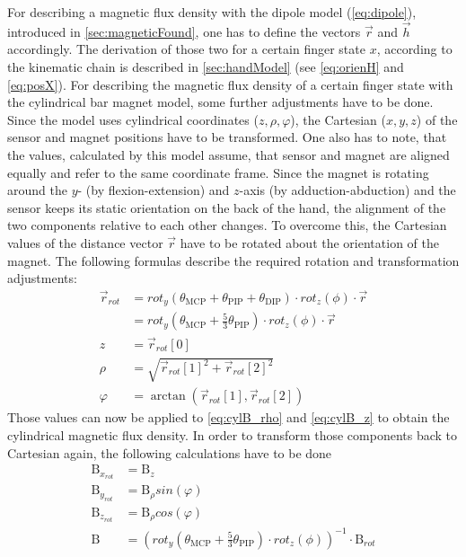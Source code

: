 For describing a magnetic flux density with the dipole model (\ref{eq:dipole}), introduced in \ref{sec:magneticFound}, one has to define the vectors $ \vec{r} $ and $ \vec{h} $ accordingly. The derivation of those two for a certain finger state $ x $, according to the kinematic chain is described in \ref{sec:handModel} (see \ref{eq:orienH} and \ref{eq:posX}). For describing the magnetic flux density of a certain finger state with the cylindrical bar magnet model, some further adjustments have to be done. Since the model uses cylindrical coordinates ($ z, \rho, \varphi $), the Cartesian ($ x, y, z $) of the sensor and magnet positions have to be transformed. One also has to note, that the values, calculated by this model assume, that sensor and magnet are aligned equally and refer to the same coordinate frame. Since the magnet is rotating around the $ y $- (by flexion-extension) and $ z $-axis (by adduction-abduction) and the sensor keeps its static orientation on the back of the hand, the alignment of the two components relative to each other changes. To overcome this, the Cartesian values of the distance vector $ \vec{r} $ have to be rotated about the orientation of the magnet. The following formulas describe the required rotation and transformation adjustments:
\begin{equation}
\begin{aligned}
\vec{r}_{rot} &= rot_{y}(\theta_{\mathrm{MCP}} + \theta_{\mathrm{PIP}} + \theta_{\mathrm{DIP}}) \cdot rot_{z}(\phi) \cdot \vec{r}\\
	&= rot_{y}(\theta_{\mathrm{MCP}} + \frac{5}{3} \theta_{\mathrm{PIP}}) \cdot rot_{z}(\phi) \cdot \vec{r}\\[3pt]
z &= \vec{r}_{rot}[0]\\
\rho &= \sqrt{\vec{r}_{rot}[1]^{2} + \vec{r}_{rot}[2]^2}\\
\varphi &= \arctan(\vec{r}_{rot}[1], \vec{r}_{rot}[2])
\end{aligned}
\end{equation}
Those values can now be applied to \ref{eq:cylB_rho} and \ref{eq:cylB_z} to obtain the cylindrical magnetic flux density. In order to transform those components back to Cartesian again, the following calculations have to be done
\begin{equation}
\begin{aligned}
\mathrm{B}_{x_{rot}} &= \mathrm{B}_{z}\\
\mathrm{B}_{y_{rot}} &= \mathrm{B}_{\rho}sin(\varphi)\\
\mathrm{B}_{z_{rot}} &= \mathrm{B}_{\rho}cos(\varphi)\\[3pt]
\mathrm{B} &= (rot_{y}(\theta_{\mathrm{MCP}} + \frac{5}{3} \theta_{\mathrm{PIP}}) \cdot rot_{z}(\phi))^{-1} \cdot \mathrm{B}_{rot}
\end{aligned}
\end{equation}
